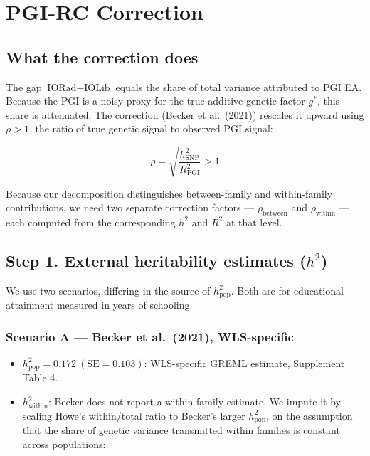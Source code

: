 \documentclass[
]{article}
\author{}
\date{}
\providecommand{\tightlist}{%
  \setlength{\itemsep}{0pt}\setlength{\parskip}{0pt}}
\begin{document}
\section{PGI-RC Correction}

\subsection{What the correction does}

The gap \(\text{IORad} - \text{IOLib}\) equals the share of total
variance attributed to PGI EA. Because the PGI is a noisy proxy for the
true additive genetic factor \(g^*\), this share is attenuated. The
correction (Becker et al.~(2021)) rescales it upward using \(\rho > 1\),
the ratio of true genetic signal to observed PGI signal:

\[\rho = \sqrt{\frac{h^2_\text{SNP}}{R^2_\text{PGI}}} > 1\]

Because our decomposition distinguishes between-family and within-family
contributions, we need two separate correction factors ---
\(\rho_\text{between}\) and \(\rho_\text{within}\) --- each computed
from the corresponding \(h^2\) and \(R^2\) at that level.


\subsection{\texorpdfstring{Step 1. External heritability estimates
(\(h^2\))}{Step 1. External heritability estimates (h\^{}2)}}

We use two scenarios, differing in the source of \(h^2_\text{pop}\).
Both are for educational attainment measured in years of schooling.

\subsubsection{Scenario A --- Becker et al.~(2021),
WLS-specific}

\begin{itemize}
\tightlist
\item
  \(h^2_\text{pop} = 0.172\ (\text{SE} = 0.103)\): WLS-specific GREML
  estimate, Supplement Table 4.
\item
  \(h^2_\text{within}\): Becker does not report a within-family
  estimate. We impute it by scaling Howe's within/total ratio to
  Becker's larger \(h^2_\text{pop}\), on the assumption that the share
  of genetic variance transmitted within families is constant across
  populations:
\end{itemize}
\end{document}
